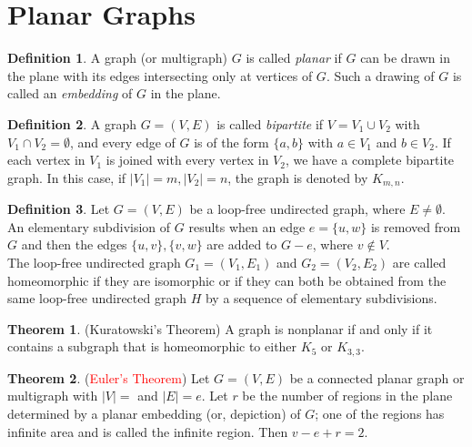 \documentclass[letter]{book}
\theoremstyle{definition}
\newtheorem{theorem}{Theorem}[chapter]
\theoremstyle{definition}
\newtheorem{mydef}{Definition}[chapter]
\theoremstyle{remark}
\begin{document}
\section{Planar Graphs}
\begin{mydef}
    A graph (or multigraph) $G$ is called \textit{planar} if $G$ can be drawn in the plane with its edges intersecting only at vertices of $G$. Such a drawing of $G$ is called an \textit{embedding} of $G$ in the plane.
\end{mydef}
\bigskip
\begin{mydef}
    A graph $G=(V,E)$ is called \textit{bipartite} if $V=V_1\cup V_2$ with $V_1\cap V_2=\emptyset$, and every edge of $G$ is of the form $\{a,b\}$ with $a\in V_1$ and $b\in V_2$. If each vertex in $V_1$ is joined with every vertex in $V_2$, we have a complete bipartite graph. In this case, if $|V_1|=m,|V_2|=n$, the graph is denoted by $K_{m,n}$.
\end{mydef}
\bigskip
\begin{mydef}
    Let $G=(V,E)$ be a loop-free undirected graph, where $E\neq \emptyset$. An elementary subdivision of $G$ results when an edge $e=\{u,w\}$ is removed from $G$ and then the edges $\{u,v\},\{v,w\}$ are added to $G-e$, where $v\notin V$.\\
    The loop-free undirected graph $G_1=(V_1,E_1)$ and $G_2=(V_2,E_2)$ are called homeomorphic if they are isomorphic or if they can both be obtained from the same loop-free undirected graph $H$ by a sequence of elementary subdivisions.
\end{mydef}
\bigskip
\begin{theorem}(Kuratowski's Theorem)
    A graph is nonplanar if and only if it contains a subgraph that is homeomorphic to either $K_5$ or $K_{3,3}$.
\end{theorem}
\bigskip
\begin{theorem} (\textcolor{red}{Euler's Theorem})
    Let $G=(V,E)$ be a connected planar graph or multigraph with $|V|=$ and $|E|=e$. Let $r$ be the number of regions in the plane determined by a planar embedding (or, depiction) of $G$; one of the regions has infinite area and is called the infinite region. Then $v-e+r=2$.
\end{theorem}
\end{document}
